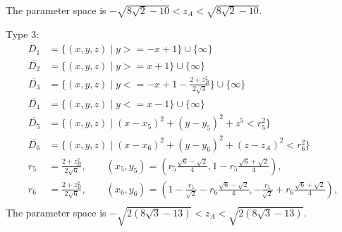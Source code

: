 \documentclass[suppldata, dvipdfmx]{interact}
\theoremstyle{plain}%
\theoremstyle{definition}
\theoremstyle{remark}
\theoremstyle{problemstyle}
\begin{document}
The parameter space is $-\sqrt{8\sqrt{2}-10} < z_A < \sqrt{8\sqrt{2} - 10}$.
\bigskip\par
Type 3:
\begin{align*}
\overline{D_1}&= \{ (x,y,z) \mid y >= -x + 1 \} \cup \{ \infty \}\\
\overline{D_2}&= \{ (x,y,z) \mid y >= x + 1 \} \cup \{ \infty \}\\
\overline{D_3}&= \{ (x,y,z) \mid y <= -x + 1 -\frac{2 + z_B^2}{2\sqrt{3}} \} \cup \{ \infty \}\\
\overline{D_4}&= \{ (x,y,z) \mid y <= x - 1 \} \cup \{ \infty \}\\
\overline{D_5}&=\{(x,y,z) \mid (x-x_5)^2+(y-y_5)^2+z^5<r_5^2 \} \\
\overline{D_6}&=\{(x,y,z) \mid (x-x_6)^2+(y-y_6)^2+(z-z_A)^2<r_6^2 \} \\
r_5 &= \frac{2 + z_B^2}{2 \sqrt{6}}, \qquad
(x_5, y_5) = \left( r_5\frac{\sqrt{6} - \sqrt{2}}{4},
 1 - r_5\frac{\sqrt{6} + \sqrt{2}}{4} \right), \\
r_6 &= \frac{2 + z_B^2}{2 \sqrt{6}}, \qquad
(x_6, y_6) = \left(1 - \frac{r_5}{\sqrt{2}} - r_6 \frac{\sqrt{6} -
 \sqrt{2}}{4}, -\frac{r_5}{\sqrt{2}} + r_6 \frac{\sqrt{6} + \sqrt{2}}{4}
 \right), \\
\end{align*}
The parameter space is $-\sqrt{2(8\sqrt{3} - 13)} < z_A < \sqrt{2(8\sqrt{3} - 13)}$.
\end{document}
